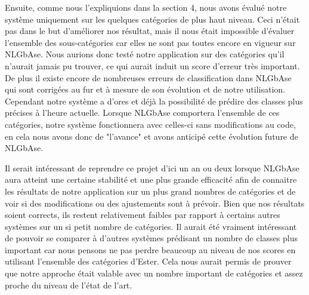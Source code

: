 \documentclass[10pt,a4paper]{article}
\begin{document}
\par Ensuite, comme nous l'expliquions dans la section 4, nous avons évalué notre système uniquement sur les quelques catégories de plus haut niveau. Ceci n'était pas dans le but d'améliorer nos résultat, mais il nous était impossible d'évaluer l'ensemble des sous-catégories car elles ne sont pas toutes encore en vigueur sur NLGbAse. Nous aurions donc testé notre application sur des catégories qu'il n'aurait jamais pu trouver, ce qui aurait induit un score d'erreur très important. De plus il existe encore de nombreuses erreurs de classification dans NLGbAse qui sont corrigées au fur et à mesure de son évolution et de notre utilisation. Cependant notre système a d'ores et déjà la possibilité de prédire des classes plus précises à l'heure actuelle. Lorsque NLGbAse comportera l'ensemble de ces catégories, notre système fonctionnera avec celles-ci sans modifications au code, en cela nous avons donc de "l'avance" et avons anticipé cette évolution future de NLGbAse.
\par Il serait intéressant de reprendre ce projet d'ici un an ou deux lorsque NLGbAse aura atteint une certaine stabilité et une plus grande efficacité afin de connaitre les résultats de notre application sur un plus grand nombres de catégories et de voir si des modifications ou des ajustements sont à prévoir. Bien que nos résultats soient corrects, ils restent relativement faibles par rapport à certains autres systèmes sur un si petit nombre de catégories. Il aurait été vraiment intéressant de pouvoir se comparer à d'autres systèmes prédisant un nombre de classes plus important car nous pensons ne pas perdre beaucoup au niveau de nos scores en utilisant l'ensemble des catégories d'Ester. Cela nous aurait permis de prouver que notre approche était valable avec un nombre important de catégories et assez proche du niveau de l'état de l'art.
\end{document}
